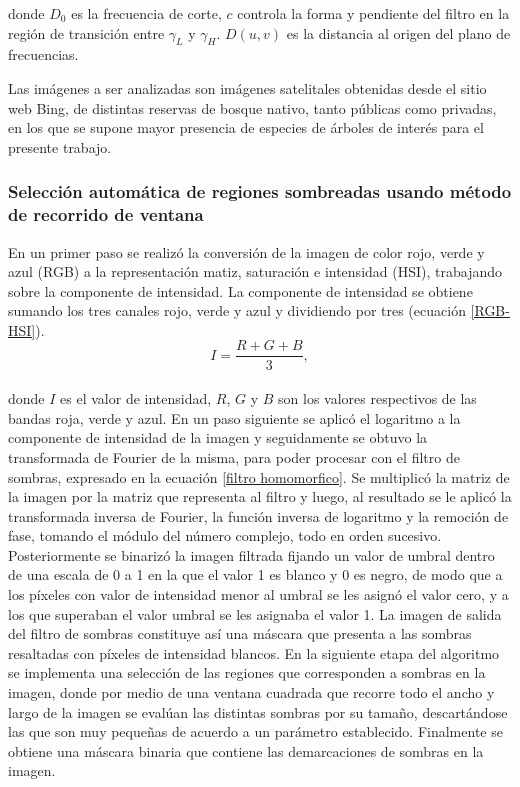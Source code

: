 donde $D_0$ es la frecuencia de corte, $c$ controla la forma y pendiente del filtro en la región de transición entre $\gamma_L$ y $\gamma_H$. $D(u,v)$ es la distancia al origen del plano de frecuencias.

Las imágenes a ser analizadas son imágenes satelitales obtenidas desde el sitio web Bing, de distintas reservas de bosque nativo, tanto públicas como privadas, %
en los que se supone mayor presencia de especies de árboles de interés para el presente trabajo. 
\subsubsection{Selección automática de regiones sombreadas usando método de recorrido de ventana} \label{metod_homo_ventana}
En un primer paso se realizó la conversión de la imagen de color rojo, verde y azul (RGB) a la representación matiz, saturación e intensidad (HSI), trabajando sobre la componente de intensidad. La componente de intensidad se obtiene sumando los tres canales rojo, verde y azul y dividiendo por tres (ecuación \ref{RGB-HSI}). 
\\
\begin{equation}
	I=\frac{R+G+B}{3},\label{RGB-HSI}
\end{equation}
\\
donde $I$ es el valor de intensidad, $R$, $G$ y $B$ son los valores respectivos de las bandas roja, verde y azul.
En un paso siguiente se aplicó el logaritmo a la componente de intensidad de la imagen y seguidamente se obtuvo la transformada de Fourier de la misma, para poder procesar con el filtro de sombras, expresado en la ecuación \ref{filtro homomorfico}. Se multiplicó la matriz de la imagen por la matriz que representa al filtro y luego, al resultado se le aplicó la transformada inversa de Fourier, la función inversa de logaritmo y la remoción de fase, tomando el módulo del número complejo, todo en orden sucesivo. 
Posteriormente se binarizó la imagen filtrada fijando un valor de umbral dentro de una escala de 0 a 1 en la que el valor 1 es blanco y 0 es negro, de modo que a los píxeles con valor de intensidad menor al umbral se les asignó el valor cero, y a los que superaban el valor umbral se les asignaba el valor 1. La imagen de salida del filtro de sombras constituye así una máscara que presenta a las sombras resaltadas con píxeles de intensidad blancos. En la siguiente etapa del algoritmo se implementa una selección de las regiones que corresponden a sombras en la imagen, donde por medio de una ventana cuadrada que recorre todo el ancho y largo de la imagen se evalúan las distintas sombras por su tamaño, descartándose las que son muy pequeñas de acuerdo a un parámetro establecido. Finalmente se obtiene una máscara binaria que contiene las demarcaciones de sombras en la imagen.

